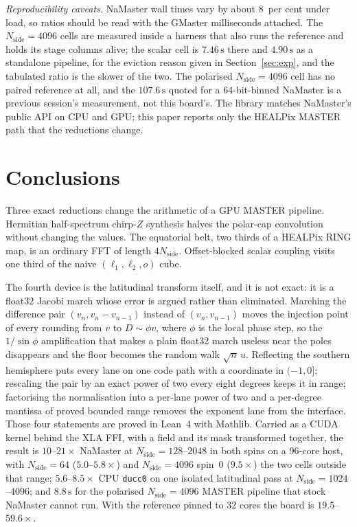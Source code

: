 \documentclass[usenatbib,useAMS]{mnras}
\begin{document}
\textit{Reproducibility caveats.} NaMaster wall times vary by about $8$~per cent under load, so ratios should be read with the GMaster milliseconds attached. The $N_{\mathrm{side}}=4096$ cells are measured inside a harness that also runs the reference and holds its stage columns alive; the scalar cell is $7.46\,\mathrm{s}$ there and $4.90\,\mathrm{s}$ as a standalone pipeline, for the eviction reason given in Section~\ref{sec:exp}, and the tabulated ratio is the slower of the two. The polarised $N_{\mathrm{side}}=4096$ cell has no paired reference at all, and the $107.6\,\mathrm{s}$ quoted for a 64-bit-binned NaMaster is a previous session's measurement, not this board's. The library matches NaMaster's public API on CPU and GPU; this paper reports only the HEALPix MASTER path that the reductions change.

\section{Conclusions}

Three exact reductions change the arithmetic of a GPU MASTER pipeline. Hermitian half-spectrum chirp-$Z$ synthesis halves the polar-cap convolution without changing the values. The equatorial belt, two thirds of a HEALPix RING map, is an ordinary FFT of length $4N_{\mathrm{side}}$. Offset-blocked scalar coupling visits one third of the naive $(\ell_1,\ell_2,o)$ cube.

The fourth device is the latitudinal transform itself, and it is not exact: it is a float32 Jacobi march whose error is argued rather than eliminated. Marching the difference pair $(v_n,v_n-v_{n-1})$ instead of $(v_n,v_{n-1})$ moves the injection point of every rounding from $v$ to $D\sim\phi v$, where $\phi$ is the local phase step, so the $1/\sin\phi$ amplification that makes a plain float32 march useless near the poles disappears and the floor becomes the random walk $\sqrt{n}\,u$. Reflecting the southern hemisphere puts every lane on one code path with a coordinate in $(-1,0]$; rescaling the pair by an exact power of two every eight degrees keeps it in range; factorising the normalisation into a per-lane power of two and a per-degree mantissa of proved bounded range removes the exponent lane from the interface. Those four statements are proved in Lean~4 with Mathlib. Carried as a CUDA kernel behind the XLA FFI, with a field and its mask transformed together, the result is $10$--$21\times$ NaMaster at $N_{\mathrm{side}}=128$--$2048$ in both spins on a 96-core host, with $N_{\mathrm{side}}=64$ ($5.0$--$5.8\times$) and $N_{\mathrm{side}}=4096$ spin~$0$ ($9.5\times$) the two cells outside that range; $5.6$--$8.5\times$ CPU \texttt{ducc0} on one isolated latitudinal pass at $N_{\mathrm{side}}=1024$--$4096$; and $8.8\,\mathrm{s}$ for the polarised $N_{\mathrm{side}}=4096$ MASTER pipeline that stock NaMaster cannot run. With the reference pinned to 32 cores the board is $19.5$--$59.6\times$.
\end{document}
